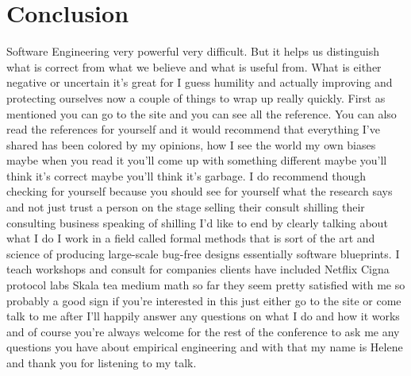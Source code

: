 \documentclass[conference, compsoc, twoside]{IEEEtran}
\begin{document}
\section{Conclusion}
Software Engineering very powerful very difficult.
But it helps us distinguish what is correct from what we believe and what is useful from.
What is either negative or uncertain it's great for I guess humility and actually improving and protecting ourselves now a couple of things to wrap up really quickly.
First as mentioned you can go to the site and you can see all the reference.
You can also read the references for yourself and it would recommend that everything I've shared
has been colored by my opinions, how I see the world my own biases maybe when
you read it you'll come up with
something different maybe you'll think
it's correct maybe you'll think it's garbage.
I do recommend though checking for yourself because you should see for yourself what the research says and not
just trust a person on the stage selling their consult shilling their consulting business speaking of shilling I'd like
to end by clearly talking about what I
do I work in a field called formal
methods that is sort of the art and
science of producing large-scale
bug-free designs essentially software blueprints.
I teach workshops and consult for companies
clients have included Netflix Cigna
protocol labs Skala tea medium math so
far they seem pretty satisfied with me
so probably a good sign if you're
interested in this just either go to the
site or come talk to me after I'll
happily answer any questions on what I
do and how it works and of course you're
always welcome for the rest of the
conference to ask me any questions you
have about empirical engineering and
with that my name is Helene and thank
you for listening to my talk.


\end{document}
